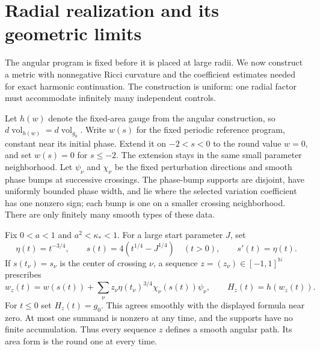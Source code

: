 \section{Radial realization and its geometric limits}
\label{n:sec-geometry-input}

The angular program is fixed before it is placed at large radii. We now construct
a metric with nonnegative Ricci curvature and the coefficient estimates
needed for exact harmonic continuation. The construction is uniform:
one radial factor must accommodate infinitely many independent controls.

Let $h(w)$ denote the fixed-area gauge from the angular construction, so
$d\operatorname{vol}_{h(w)}=d\operatorname{vol}_{g_0}$. Write $w(s)$ for
the fixed periodic reference program, constant near its initial phase.
Extend it on $-2<s<0$ to the round value $w=0$, and set $w(s)=0$ for
$s\leq-2$. The extension stays in the same small parameter neighborhood.
Let $\psi_\nu$ and $\chi_\nu$ be the fixed perturbation directions and
smooth phase bumps at successive crossings. The phase-bump supports are disjoint,
have uniformly bounded phase width, and lie where the selected variation
coefficient has one nonzero sign; each bump is one on a smaller crossing
neighborhood. There are only finitely many smooth types of these data.

Fix $0<a<1$ and $a^2<\kappa_*<1$. For a large start parameter $J$, set
\[
 \eta(t)=t^{-3/4},\qquad
 s(t)=4(t^{1/4}-J^{1/4})\quad(t>0),\qquad s'(t)=\eta(t).
\]
If $s(t_\nu)=s_\nu$ is the center of crossing $\nu$, a sequence
$z=(z_\nu)\in[-1,1]^{\mathbb N}$ prescribes
\begin{equation}\label{n:controlled-angular-input}
 w_z(t)=w(s(t))+
 \sum_\nu z_\nu\eta(t_\nu)^{3/4}\chi_\nu(s(t))\psi_\nu,
 \qquad H_z(t)=h(w_z(t)).
\end{equation}
For $t\leq0$ set $H_z(t)=g_0$. This agrees smoothly with the displayed
formula near zero. At most one summand is nonzero at any time, and the
supports have no finite accumulation. Thus every sequence $z$ defines a
smooth angular path. Its area form is the round one at every time.

